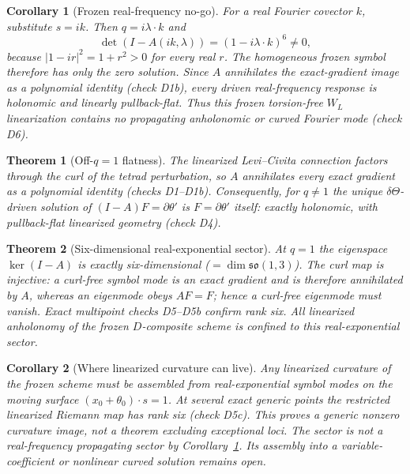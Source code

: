 \documentclass[11pt,a4paper]{article}
\newtheorem{theorem}{Theorem}
\newtheorem{corollary}{Corollary}
\begin{document}
\begin{corollary}[Frozen real-frequency no-go]\label{cor:fourier}
For a real Fourier covector $k$, substitute $s=ik$.  Then
$q=i\lambda\!\cdot\!k$ and
\begin{equation}
  \det(I-A(ik,\lambda))=(1-i\lambda\!\cdot\!k)^6\neq0,
\end{equation}
because $|1-ir|^2=1+r^2>0$ for every real $r$.  The homogeneous frozen
symbol therefore has only the zero solution.  Since $A$ annihilates the
exact-gradient image as a polynomial identity (check D1b), every driven
real-frequency response is holonomic and linearly pullback-flat.  Thus
this frozen torsion-free $W_L$ linearization contains no propagating
anholonomic or curved Fourier mode (check D6).
\end{corollary}

\begin{theorem}[Off-$q=1$ flatness]\label{thm:offres}
The linearized Levi--Civita connection factors through the curl of the
tetrad perturbation, so $A$ annihilates every exact gradient as a
polynomial identity (checks D1--D1b).  Consequently, for $q\neq1$ the
unique $\delta\Theta$-driven solution of
$(I-A)F=\partial\theta'$ is $F=\partial\theta'$ itself: exactly
holonomic, with pullback-flat linearized geometry (check D4).
\end{theorem}

\begin{theorem}[Six-dimensional real-exponential sector]
\label{thm:res}
At $q=1$ the eigenspace $\ker(I-A)$ is exactly six-dimensional
($=\dim\mathfrak{so}(1,3)$).  The curl map is injective: a curl-free
symbol mode is an exact gradient and is therefore annihilated by $A$,
whereas an eigenmode obeys $AF=F$; hence a curl-free eigenmode must
vanish.  Exact multipoint checks D5--D5b confirm rank six.  All
linearized anholonomy of the frozen $D$-composite scheme is confined to
this real-exponential sector.
\end{theorem}

\begin{corollary}[Where linearized curvature can live]
Any linearized curvature of the frozen scheme must be assembled from
real-exponential symbol modes on the moving surface
$(x_0+\theta_0)\!\cdot\!s=1$.  At several exact generic points the
restricted linearized Riemann map has rank six (check D5c).  This proves
a generic nonzero curvature image, not a theorem excluding exceptional
loci.  The sector is not a real-frequency propagating sector by
Corollary~\ref{cor:fourier}.  Its assembly into a variable-coefficient or
nonlinear curved solution remains open.
\end{corollary}
\end{document}
